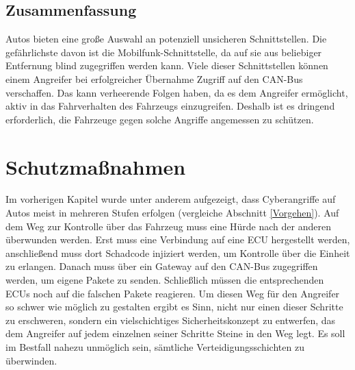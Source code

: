 \section{Zusammenfassung}
Autos bieten eine große Auswahl an potenziell unsicheren Schnittstellen. Die gefährlichste davon ist die Mobilfunk-Schnittstelle, da auf sie aus beliebiger Entfernung blind zugegriffen werden kann. Viele dieser Schnittstellen können einem Angreifer bei erfolgreicher Übernahme Zugriff auf den \acs{CAN}-Bus verschaffen. Das kann verheerende Folgen haben, da es dem Angreifer ermöglicht, aktiv in das Fahrverhalten des Fahrzeugs einzugreifen. Deshalb ist es dringend erforderlich, die Fahrzeuge gegen solche Angriffe angemessen zu schützen.




\chapter{Schutzmaßnahmen}


Im vorherigen Kapitel wurde unter anderem aufgezeigt, dass Cyberangriffe auf Autos meist in mehreren Stufen erfolgen (vergleiche Abschnitt \ref{Vorgehen}). Auf dem Weg zur Kontrolle über das Fahrzeug muss eine Hürde nach der anderen überwunden werden. Erst muss eine Verbindung auf eine \acs{ECU} hergestellt werden, anschließend muss dort Schadcode injiziert werden, um Kontrolle über die Einheit zu erlangen. Danach muss über ein Gateway auf den \acs{CAN}-Bus zugegriffen werden, um eigene Pakete zu senden. Schließlich müssen die entsprechenden \acsp{ECU} noch auf die falschen Pakete reagieren.
Um diesen Weg für den Angreifer so schwer wie möglich zu gestalten ergibt es Sinn, nicht nur einen dieser Schritte zu erschweren, sondern ein vielschichtiges Sicherheitskonzept zu entwerfen, das dem Angreifer auf jedem einzelnen seiner Schritte Steine in den Weg legt. Es soll im Bestfall nahezu unmöglich sein, sämtliche Verteidigungsschichten zu überwinden.


